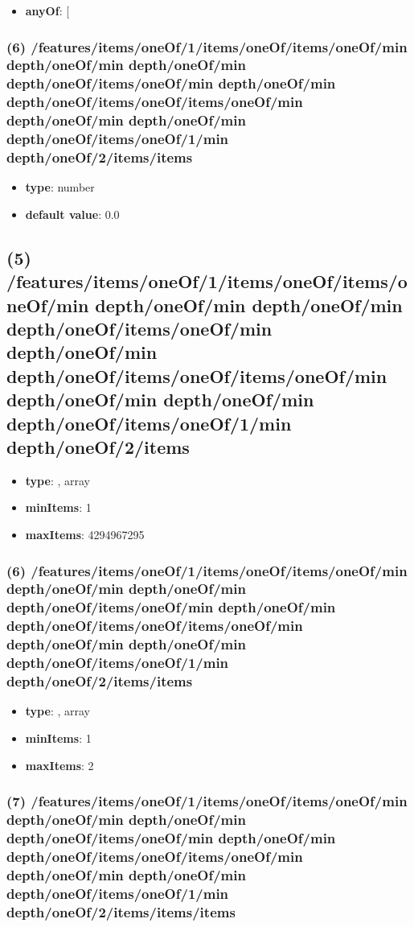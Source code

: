 \begin{itemize}[leftmargin=6em]\item {\bf anyOf}: [\end{itemize}\subsubsection{(6) /features/items/oneOf/1/items/oneOf/items/oneOf/min depth/oneOf/min depth/oneOf/min depth/oneOf/items/oneOf/min depth/oneOf/min depth/oneOf/items/oneOf/items/oneOf/min depth/oneOf/min depth/oneOf/min depth/oneOf/items/oneOf/1/min depth/oneOf/2/items/items}
\begin{itemize}[leftmargin=6em]\item {\bf type}: number\item {\bf default value}: 0.0
\end{itemize}\subsection{(5) /features/items/oneOf/1/items/oneOf/items/oneOf/min depth/oneOf/min depth/oneOf/min depth/oneOf/items/oneOf/min depth/oneOf/min depth/oneOf/items/oneOf/items/oneOf/min depth/oneOf/min depth/oneOf/min depth/oneOf/items/oneOf/1/min depth/oneOf/2/items}
\begin{itemize}[leftmargin=5em]\item {\bf type}: , array\item {\bf minItems}: 1
\item {\bf maxItems}: 4294967295
\end{itemize}\subsubsection{(6) /features/items/oneOf/1/items/oneOf/items/oneOf/min depth/oneOf/min depth/oneOf/min depth/oneOf/items/oneOf/min depth/oneOf/min depth/oneOf/items/oneOf/items/oneOf/min depth/oneOf/min depth/oneOf/min depth/oneOf/items/oneOf/1/min depth/oneOf/2/items/items}
\begin{itemize}[leftmargin=6em]\item {\bf type}: , array\item {\bf minItems}: 1
\item {\bf maxItems}: 2
\end{itemize}\subsubsection{(7) /features/items/oneOf/1/items/oneOf/items/oneOf/min depth/oneOf/min depth/oneOf/min depth/oneOf/items/oneOf/min depth/oneOf/min depth/oneOf/items/oneOf/items/oneOf/min depth/oneOf/min depth/oneOf/min depth/oneOf/items/oneOf/1/min depth/oneOf/2/items/items/items}
